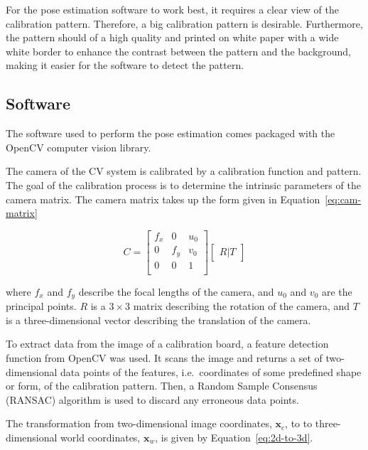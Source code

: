 For the pose estimation software to work best, it requires a clear view of the calibration pattern. Therefore, a big calibration pattern is desirable. Furthermore, the pattern should of a high quality and printed on white paper with a wide white border to enhance the contrast between the pattern and the background, making it easier for the software to detect the pattern. 

\subsection{Software}
\label{sec:cv-sys-software}

The software used to perform the pose estimation comes packaged with the OpenCV computer vision library. 

The camera of the CV system is calibrated by a calibration function and pattern. The goal of the calibration process is to determine the intrinsic parameters of the camera matrix. The camera matrix takes up the form given in Equation~\ref{eq:cam-matrix}

\begin{equation}
  \label{eq:cam-matrix}
  C = 
  \begin{bmatrix}
    f_x & 0   & u_0 \\
    0   & f_y & v_0 \\
    0   & 0   & 1   \\
  \end{bmatrix}
  \begin{bmatrix}
    R | T
  \end{bmatrix}
\end{equation}

where $f_x$ and $f_y$ describe the focal lengths of the camera, and $u_0$ and $v_0$ are the principal points. $R$ is a $3\times3$ matrix describing the rotation of the camera, and $T$ is a three-dimensional vector describing the translation of the camera. 

To extract data from the image of a calibration board, a feature detection function from OpenCV was used. It scans the image and returns a set of two-dimensional data points of the features, i.e.\ coordinates of some predefined shape or form, of the calibration pattern. Then, a Random Sample Consensus (RANSAC) algorithm is used to discard any erroneous data points.

The transformation from two-dimensional image coordinates, $\bm{x}_c$, to to three-dimensional world coordinates, $\bm{x}_w$, is given by Equation~\ref{eq:2d-to-3d}.

